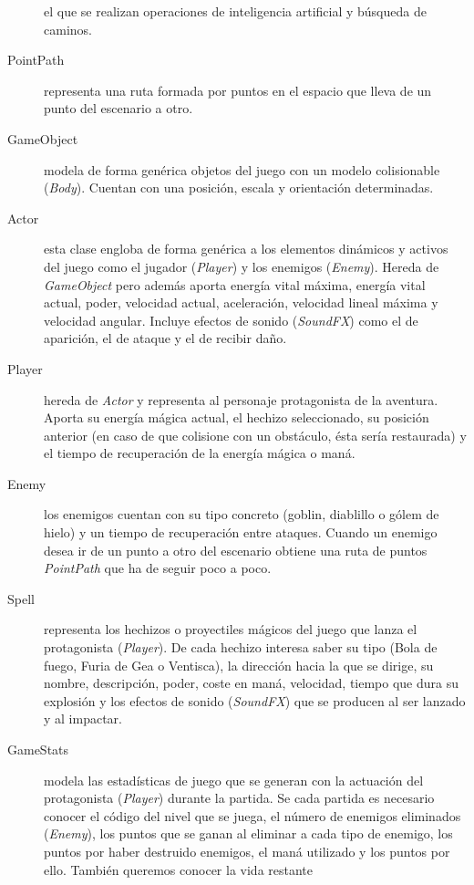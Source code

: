 \begin{description}
    el que se realizan operaciones de inteligencia artificial y búsqueda
    de caminos.
    \item [PointPath] representa una ruta formada por puntos en el espacio
    que lleva de un punto del escenario a otro.
    \item [GameObject] modela de forma genérica objetos del juego con un
    modelo colisionable (\textit{Body}). Cuentan con una posición, escala
    y orientación determinadas. 
    \item [Actor] esta clase engloba de forma genérica a los elementos dinámicos
    y activos del juego como el jugador (\textit{Player}) y los enemigos
    (\textit{Enemy}). Hereda de \textit{GameObject} pero además aporta
    energía vital máxima, energía vital actual, poder, velocidad actual,
    aceleración, velocidad lineal máxima y velocidad angular. Incluye efectos
    de sonido (\textit{SoundFX}) como el de aparición, el de ataque
    y el de recibir daño.
    \item [Player] hereda de \textit{Actor} y representa al personaje
    protagonista de la aventura. Aporta su energía mágica actual, el
    hechizo seleccionado, su posición anterior (en caso de que colisione
    con un obstáculo, ésta sería restaurada) y el tiempo de recuperación
    de la energía mágica o maná.
    \item [Enemy] los enemigos cuentan con su tipo concreto (goblin, diablillo
    o gólem de hielo) y un tiempo de recuperación entre ataques. Cuando 
    un enemigo desea ir de un punto a otro del escenario obtiene una ruta
    de puntos \textit{PointPath} que ha de seguir poco a poco.
    \item [Spell] representa los hechizos o proyectiles mágicos del juego
    que lanza el protagonista (\textit{Player}). De cada hechizo interesa saber su tipo
    (Bola de fuego, Furia de Gea o Ventisca), la dirección hacia la que
    se dirige, su nombre, descripción, poder, coste en maná, velocidad,
    tiempo que dura su explosión y los efectos de sonido (\textit{SoundFX})
    que se producen al ser lanzado y al impactar.
    \item [GameStats] modela las estadísticas de juego que se generan con
    la actuación del protagonista (\textit{Player}) durante la partida.
    Se cada partida es necesario conocer el código del nivel que se juega,
    el número de enemigos eliminados (\textit{Enemy}), los puntos que se ganan al eliminar
    a cada tipo de enemigo, los puntos por haber destruido enemigos, el maná
    utilizado y los puntos por ello. También queremos conocer la vida restante

\end{description}
